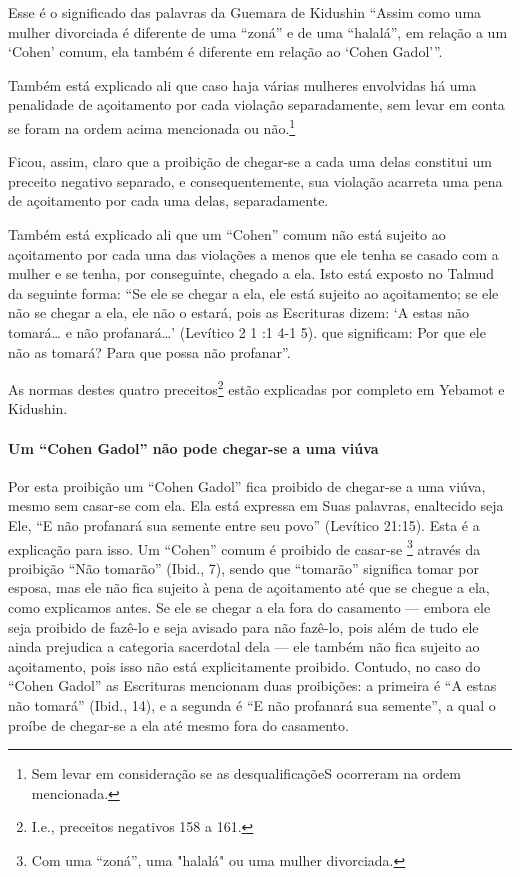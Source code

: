 Esse é o significado das palavras da Guemara de Kidushin ``Assim como
uma mulher divorciada é diferente de uma ``zoná'' e de uma ``halalá'', em
relação a um `Cohen' comum, ela também é diferente em relação ao `Cohen Gadol'''.

Também está explicado ali que caso haja várias mulheres envolvidas há
uma penalidade de açoitamento por cada violação separadamente, sem
levar em conta se foram na ordem acima mencionada ou
não.\footnote{Sem levar em consideração se as desqualificaçõeS ocorreram na ordem
mencionada.}

Ficou, assim, claro que a proibição de chegar-se a cada uma delas
constitui um preceito negativo separado, e consequentemente, sua
violação acarreta uma pena de açoitamento por cada uma delas,
separadamente.

Também está explicado ali que um ``Cohen'' comum não está sujeito ao
açoitamento por cada uma das violações a menos que ele tenha se casado
com a mulher e se tenha, por conseguinte, chegado a ela. Isto está
exposto no Talmud da seguinte forma: ``Se ele se chegar a ela, ele está
sujeito ao açoitamento; se ele não se chegar a ela, ele não o estará,
pois as Escrituras dizem: `A estas não tomará\ldots{} e não profanará\ldots{}'
(Levítico 2 1 :1 4-1 5). que significam: Por que ele não as tomará? Para
que possa não profanar''.

As normas destes quatro preceitos\footnote{I.e., preceitos negativos 158 a 161.} estão explicadas
por completo em Yebamot e Kidushin.

\paragraph{Um ``Cohen Gadol'' não pode chegar-se a uma viúva}

Por esta proibição um ``Cohen Gadol'' fica proibido de chegar-se a uma
viúva, mesmo sem casar-se com ela. Ela está expressa em Suas palavras,
enaltecido seja Ele, ``E não profanará sua semente entre seu povo''
(Levítico 21:15). Esta é a explicação para isso. Um ``Cohen'' comum é
proibido de casar-se \footnote{Com uma ``zoná'', uma "halalá" ou uma mulher divorciada.} através da proibição ``Não
tomarão'' (Ibid., 7), sendo que ``tomarão'' significa tomar por esposa,
mas ele não fica sujeito à pena de açoitamento até que se chegue a ela,
como explicamos antes. Se ele se chegar a ela fora do casamento ---
embora ele seja proibido de fazê-lo e seja avisado para não fazê-lo,
pois além de tudo ele ainda prejudica a categoria sacerdotal dela ---
ele também não fica sujeito ao açoitamento, pois isso não está
explicitamente proibido. Contudo, no caso do ``Cohen Gadol'' as
Escrituras mencionam duas proibições: a primeira é ``A estas não
tomará'' (Ibid., 14), e a segunda é ``E não profanará sua semente'', a
qual o proíbe de chegar-se a ela até mesmo fora do casamento.

